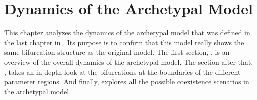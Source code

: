 \chapter{Dynamics of the Archetypal Model}
\label{chap:arch}

This chapter analyzes the dynamics of the archetypal model that was defined in the last chapter in .
Its purpose is to confirm that this model really shows the same bifurcation structure as the original model.
The first section, , is an overview of the overall dynamics of the archetypal model.
The section after that, , takes an in-depth look at the bifurcations at the boundaries of the different parameter regions.
And finally,  explores all the possible coexistence scenarios in the archetypal model.






\clearpage

